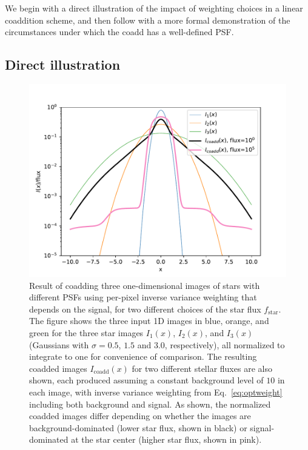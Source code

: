 \documentclass{aastex63}
\newcommand{\irresponse}[1]{{#1}}
\begin{document}
We begin with a direct illustration of the impact of weighting choices in a linear coaddition scheme, and then follow with a more formal demonstration of the circumstances under which the coadd has a well-defined PSF.

\subsection{Direct illustration}\label{subsec:direct}

\begin{figure}
\begin{center}
\includegraphics[width=5.5in]{figures/coadd_psf.pdf}
 \caption{Result of coadding three one-dimensional images of stars with different PSFs using \irresponse{per-pixel} inverse variance weighting that \irresponse{depends on} the signal, for two different choices of the star flux $f_\text{star}$.  The figure shows the \irresponse{three input} 1D images \irresponse{in blue, orange, and green} for the three star images $I_1(x)$, $I_2(x)$, and $I_3(x)$ (Gaussians with $\sigma=0.5$, $1.5$ and $3.0$, respectively), all normalized to integrate to one for convenience of comparison. \irresponse{The resulting coadded images $I_\text{coadd}(x)$ for two different stellar fluxes are also shown, each} produced assuming a constant background level of $10$ in each image, with inverse variance weighting from Eq.~\eqref{eq:optweight} including both background and signal.  As shown, the \irresponse{normalized} coadded images differ depending on whether the images are background-dominated (lower star flux, shown in black) or signal-dominated at the star center (higher star flux, shown in pink).} \label{fig:coadd_psf}
\end{center}
 \end{figure}
 
\end{document}
